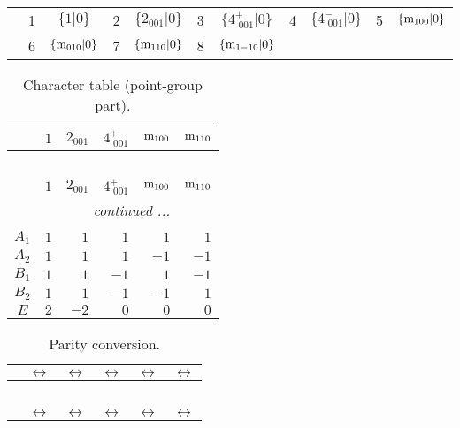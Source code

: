 \documentclass[fleqn,10pt,landscape]{article}
\begin{document}
\begin{itemize}
\begin{center}
\begin{longtable}{c|cc|cc|cc|cc|cc}
 & 1 & $\{1|0\}$ & 2 & $\{2{}_{001}|0\}$ & 3 & $\{4^{+}_{\,\,001}|0\}$ & 4 & $\{4^{-}_{\,\,001}|0\}$ & 5 & $\{{\rm m}_{100}|0\}$ \\
& 6 & $\{{\rm m}_{010}|0\}$ & 7 & $\{{\rm m}_{110}|0\}$ & 8 & $\{{\rm m}_{1-10}|0\}$ &  &  &  &  \\
\end{longtable}
\end{center}
\begin{center}
\renewcommand{\arraystretch}{1.0}
\begin{longtable}{c|rrrrr}
\caption{Character table (point-group part).}
 \\
 \hline \hline
 & $ 1 $ & $ 2{}_{001} $ & $ 4^{+}_{\,\,001} $ & $ {\rm m}_{100} $ & $ {\rm m}_{110} $ \\ \hline \endfirsthead

\multicolumn{5}{l}{\tablename\ \thetable{}} \\
 \hline \hline
 & $ 1 $ & $ 2{}_{001} $ & $ 4^{+}_{\,\,001} $ & $ {\rm m}_{100} $ & $ {\rm m}_{110} $ \\ \hline \endhead

 \hline \hline
\multicolumn{5}{r}{\footnotesize\it continued ...} \\ \endfoot

 \hline \hline
\multicolumn{5}{r}{} \\ \endlastfoot

$ A_{1} $ & $ 1 $ & $ 1 $ & $ 1 $ & $ 1 $ & $ 1 $ \\
$ A_{2} $ & $ 1 $ & $ 1 $ & $ 1 $ & $ -1 $ & $ -1 $ \\
$ B_{1} $ & $ 1 $ & $ 1 $ & $ -1 $ & $ 1 $ & $ -1 $ \\
$ B_{2} $ & $ 1 $ & $ 1 $ & $ -1 $ & $ -1 $ & $ 1 $ \\
$ E $ & $ 2 $ & $ -2 $ & $ 0 $ & $ 0 $ & $ 0 $ \\
\end{longtable}
\end{center}
\begin{center}
\renewcommand{\arraystretch}{1.0}
\begin{longtable}{cccccc}
\caption{Parity conversion.}
 \\
 \hline \hline
 & $\leftrightarrow$ & $\leftrightarrow$ & $\leftrightarrow$ & $\leftrightarrow$ & $\leftrightarrow$ \\ \hline \endfirsthead

\multicolumn{5}{l}{\tablename\ \thetable{}} \\
 \hline \hline
 & $\leftrightarrow$ & $\leftrightarrow$ & $\leftrightarrow$ & $\leftrightarrow$ & $\leftrightarrow$ \\ \hline \endhead


\end{longtable}
\end{center}
\end{itemize}
\end{document}
